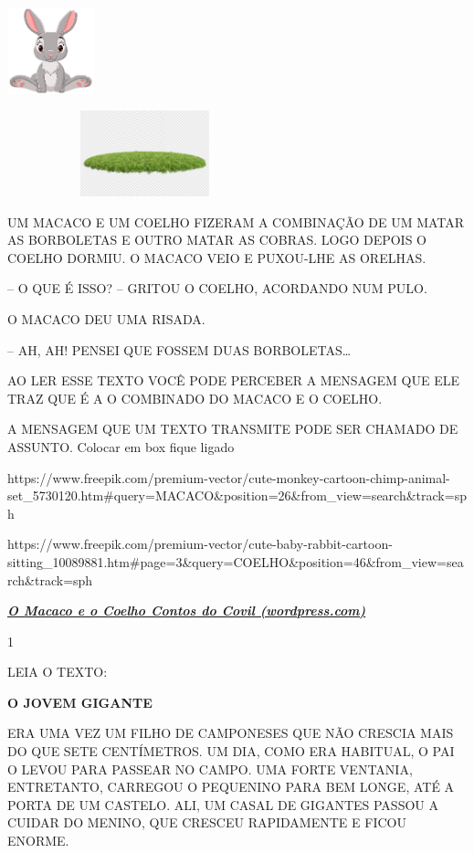 {{\includegraphics[width=0.98508in,height=0.98508in]{media/image117.png}

\includegraphics[width=3.14122in,height=0.97761in]{media/image118.jpeg}

UM MACACO E UM COELHO FIZERAM A COMBINAÇÃO DE UM MATAR AS BORBOLETAS E
OUTRO MATAR AS COBRAS. LOGO DEPOIS O COELHO DORMIU. O MACACO VEIO E
PUXOU-LHE AS ORELHAS.

-- O QUE É ISSO? -- GRITOU O COELHO, ACORDANDO NUM PULO.

O MACACO DEU UMA RISADA.

-- AH, AH! PENSEI QUE FOSSEM DUAS BORBOLETAS\ldots{}

AO LER ESSE TEXTO VOCÊ PODE PERCEBER A MENSAGEM QUE ELE TRAZ QUE É A O
COMBINADO DO MACACO E O COELHO.

A MENSAGEM QUE UM TEXTO TRANSMITE PODE SER CHAMADO DE ASSUNTO. Colocar
em box fique ligado

https://www.freepik.com/premium-vector/cute-monkey-cartoon-chimp-animal-set\_5730120.htm\#query=MACACO\&position=26\&from\_view=search\&track=sph

https://www.freepik.com/premium-vector/cute-baby-rabbit-cartoon-sitting\_10089881.htm\#page=3\&query=COELHO\&position=46\&from\_view=search\&track=sph

\href{https://contosdocovil.wordpress.com/2008/05/17/o-macaco-e-o-coelho/}{\textbf{\emph{O
Macaco e o Coelho \textbar{} Contos do Covil (wordpress.com)}}}


\num{1}

LEIA O TEXTO:

\protect\hypertarget{_Hlk129095095}{}{}\textbf{O JOVEM GIGANTE}

ERA UMA VEZ UM FILHO DE CAMPONESES QUE NÃO CRESCIA MAIS DO QUE SETE
CENTÍMETROS. UM DIA, COMO ERA HABITUAL, O PAI O LEVOU PARA PASSEAR NO
CAMPO. UMA FORTE VENTANIA, ENTRETANTO, CARREGOU O PEQUENINO PARA BEM
LONGE, ATÉ A PORTA DE UM CASTELO. ALI, UM CASAL DE GIGANTES PASSOU A
CUIDAR DO MENINO, QUE CRESCEU RAPIDAMENTE E FICOU ENORME.

}}
